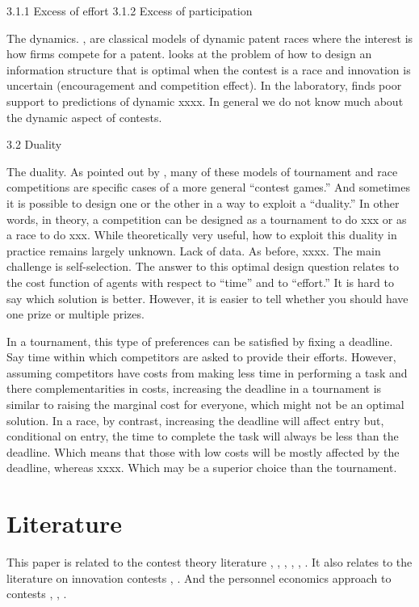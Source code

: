 \documentclass[12pt,]{article}
\begin{document}
3.1.1 Excess of effort 3.1.2 Excess of participation

The dynamics. \citet{harris1987racing}, \citet{grossman1987dynamic} are
classical models of dynamic patent races where the interest is how firms
compete for a patent. \citet{bimpikis2014designing} looks at the problem
of how to design an information structure that is optimal when the
contest is a race and innovation is uncertain (encouragement and
competition effect). In the laboratory, \citet{zizzo2002racing} finds
poor support to predictions of dynamic xxxx. In general we do not know
much about the dynamic aspect of contests.

3.2 Duality

The duality. As pointed out by \citet{baye2003strategic}, many of these
models of tournament and race competitions are specific cases of a more
general ``contest games.'' And sometimes it is possible to design one or
the other in a way to exploit a ``duality.'' In other words, in theory,
a competition can be designed as a tournament to do xxx or as a race to
do xxx. While theoretically very useful, how to exploit this duality in
practice remains largely unknown. Lack of data. As before, xxxx. The
main challenge is self-selection. The answer to this optimal design
question relates to the cost function of agents with respect to ``time''
and to ``effort.'' It is hard to say which solution is better. However,
it is easier to tell whether you should have one prize or multiple
prizes.

In a tournament, this type of preferences can be satisfied by fixing a
deadline. Say time within which competitors are asked to provide their
efforts. However, assuming competitors have costs from making less time
in performing a task and there complementarities in costs, increasing
the deadline in a tournament is similar to raising the marginal cost for
everyone, which might not be an optimal solution. In a race, by
contrast, increasing the deadline will affect entry but, conditional on
entry, the time to complete the task will always be less than the
deadline. Which means that those with low costs will be mostly affected
by the deadline, whereas xxxx. Which may be a superior choice than the
tournament.

\section{Literature}\label{literature}

This paper is related to the contest theory literature
\citet{dixit1987strategic} \citet{baye2003strategic},
\citet{parreiras2010contests}, \citet{moldovanu2001optimal},
\citet{moldovanu2006contest}, \citet{siegel2009all},
\citet{siegel2014contests}. It also relates to the literature on
innovation contests \citet{taylor1995digging}, \citet{che2003optimal}.
And the personnel economics approach to contests \citet{lazear1981rank},
\citet{green1983comparison}, \citet{mary1984economic}.
\end{document}
